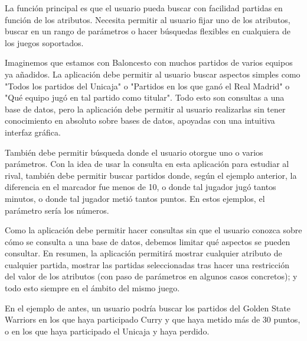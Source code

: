 La función principal es que el usuario pueda buscar con facilidad partidas en función de los atributos. Necesita permitir al usuario fijar uno de los atributos, buscar en un rango de parámetros o hacer búsquedas flexibles en cualquiera de los juegos soportados.

Imaginemos que estamos con Baloncesto con muchos partidos de varios equipos ya añadidos. La aplicación debe permitir al usuario buscar aspectos simples como "Todos los partidos del Unicaja" o "Partidos en los que ganó el Real Madrid" o "Qué equipo jugó en tal partido como titular". Todo esto son consultas a una base de datos, pero la aplicación debe permitir al usuario realizarlas sin tener conocimiento en absoluto sobre bases de datos, apoyadas con una intuitiva interfaz gráfica. 

También debe permitir búsqueda donde el usuario otorgue uno o varios parámetros. Con la idea de usar la consulta en esta aplicación para estudiar al rival, también debe permitir buscar partidos donde, según el ejemplo anterior, la diferencia en el marcador fue menos de 10, o donde tal jugador jugó tantos minutos, o donde tal jugador metió tantos puntos. En estos ejemplos, el parámetro sería los números.

Como la aplicación debe permitir hacer consultas sin que el usuario conozca sobre cómo se consulta a una base de datos, debemos limitar qué aspectos se pueden consultar. En resumen, la aplicación permitirá mostrar cualquier atributo de cualquier partida, mostrar las partidas seleccionadas tras hacer una restricción del valor de los atributos (con paso de parámetros en algunos casos concretos); y todo esto siempre en el ámbito del mismo juego.


  En el ejemplo de antes, un usuario podría buscar los partidos del Golden State Warriors en los que haya participado Curry y que haya metido más de 30 puntos, o en los que haya participado el Unicaja y haya perdido.
